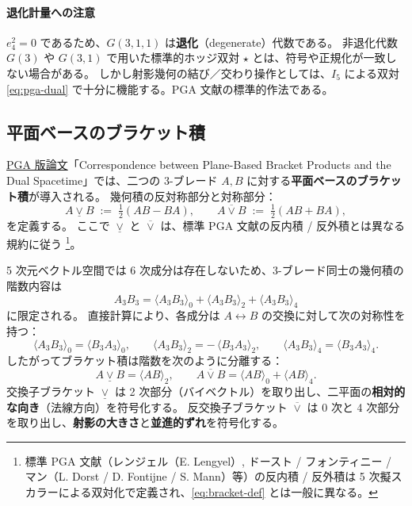 \documentclass[dvipdfmx,a4paper,oneside]{jsbook}
\numberwithin{equation}{chapter}
\begin{document}
\paragraph{退化計量への注意}
\(e_4^2 = 0\) であるため、\(G(3,1,1)\) は\textbf{退化}（degenerate）代数である。
非退化代数 \(G(3)\) や \(G(3,1)\) で用いた標準的ホッジ双対 \(\star\) とは、符号や正規化が一致しない場合がある。
しかし射影幾何の結び／交わり操作としては、\(I_5\) による双対 \eqref{eq:pga-dual} で十分に機能する。PGA 文献の標準的作法である。

\subsection{平面ベースのブラケット積}

\hyperref[sec:sister-manuscripts]{PGA 版論文}「Correspondence between Plane-Based Bracket Products and the Dual Spacetime」では、二つの 3-ブレード \(A, B\) に対する\textbf{平面ベースのブラケット積}が導入される。
幾何積の反対称部分と対称部分：
\begin{equation}
  A \mathbin{\underline{\vee}} B \;:=\; \tfrac{1}{2}(AB - BA),
  \qquad
  A \mathbin{\overline{\vee}} B \;:=\; \tfrac{1}{2}(AB + BA),
  \label{eq:bracket-def}
\end{equation}
を定義する。
ここで \(\mathbin{\underline{\vee}}\) と \(\mathbin{\overline{\vee}}\) は、標準 PGA 文献の反内積 / 反外積とは異なる規約に従う \footnote{標準 PGA 文献（レンジェル（E. Lengyel）, ドースト / フォンティニー / マン（L. Dorst / D. Fontijne / S. Mann）等）の反内積 / 反外積は 5 次擬スカラーによる双対化で定義され、\eqref{eq:bracket-def} とは一般に異なる。}。

5 次元ベクトル空間では 6 次成分は存在しないため、3-ブレード同士の幾何積の階数内容は
\[
  A_3 B_3 = \langle A_3 B_3 \rangle_0 + \langle A_3 B_3 \rangle_2 + \langle A_3 B_3 \rangle_4
\]
に限定される。
直接計算により、各成分は \(A \leftrightarrow B\) の交換に対して次の対称性を持つ：
\[
  \langle A_3 B_3 \rangle_0 = \langle B_3 A_3 \rangle_0,
  \qquad
  \langle A_3 B_3 \rangle_2 = -\,\langle B_3 A_3 \rangle_2,
  \qquad
  \langle A_3 B_3 \rangle_4 = \langle B_3 A_3 \rangle_4.
\]
したがってブラケット積は階数を次のように分離する：
\begin{equation}
  A \mathbin{\underline{\vee}} B = \langle AB \rangle_2,
  \qquad
  A \mathbin{\overline{\vee}} B = \langle AB \rangle_0 + \langle AB \rangle_4.
  \label{eq:bracket-grades}
\end{equation}
交換子ブラケット \(\mathbin{\underline{\vee}}\) は 2 次部分（バイベクトル）を取り出し、二平面の\textbf{相対的な向き}（法線方向）を符号化する。
反交換子ブラケット \(\mathbin{\overline{\vee}}\) は 0 次と 4 次部分を取り出し、\textbf{射影の大きさ}と\textbf{並進的ずれ}を符号化する。
\end{document}
